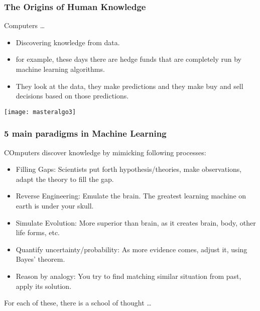\begin{frame}[fragile]\frametitle{The Origins of Human Knowledge}
Computers \ldots

  \begin{itemize}
    \item Discovering knowledge from data.
	\item for example, these days there are hedge funds that are completely run by machine learning algorithms. 
	\item They look at the data, they make predictions and they make buy and sell decisions based on those predictions. 
	\end{itemize}

 \begin{center}
\texttt{[image: masteralgo3]}
\end{center}

  
\end{frame}

\begin{frame}[fragile]\frametitle{5 main paradigms in Machine Learning}
COmputers discover knowledge by mimicking following processes:
  \begin{itemize}
    \item Filling Gaps: Scientists put forth hypothesis/theories, make observations, adapt the theory to fill the gap.
	\item Reverse Engineering: Emulate the brain. The greatest learning machine on earth is under your skull.
	\item Simulate Evolution: More superior than brain, as it creates brain, body, other life forms, etc.
	\item Quantify uncertainty/probability: As more evidence comes, adjust it, using Bayes' theorem.
	\item Reason by analogy: You try to find matching similar situation from past, apply its solution.
  \end{itemize}
  
  For each of these, there is a school of thought \ldots
\end{frame}

